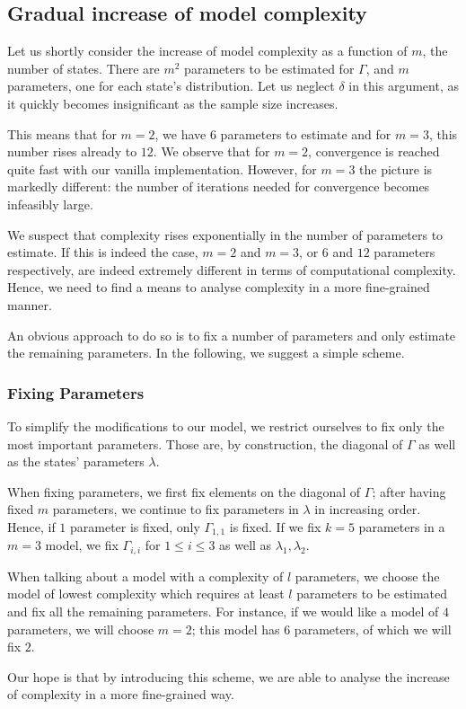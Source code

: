 \subsection{Gradual increase of model complexity}

Let us shortly consider the increase of model complexity as a function of $m$, the number of states. There are $m^2$ parameters to be estimated for $\Gamma$, and $m$ parameters, one for each state's distribution. Let us neglect $\delta$ in this argument, as 
it quickly becomes insignificant as the sample size increases.

This means that for $m=2$, we have $6$ parameters to estimate and for $m=3$, this number rises already to $12$. We observe that for $m=2$, convergence is reached quite fast with our vanilla implementation. However, for $m=3$ the picture is markedly different: the number of iterations needed for convergence becomes infeasibly large.
 
We suspect that complexity rises exponentially in the number of parameters to estimate. If this is indeed the case, $m=2$ and $m=3$, or $6$ and $12$ parameters respectively, are indeed extremely different in terms of computational complexity. Hence, we need to find a means to analyse complexity in a more fine-grained manner. 


An obvious approach to do so is to fix a number of parameters and only estimate the remaining parameters.  In the following, we suggest a simple scheme. 


\subsubsection{Fixing Parameters}
To simplify the modifications to our model, we restrict ourselves to fix only the most important parameters. Those are, by construction, the diagonal of $\Gamma$ as well as the states' parameters $\lambda$. 

When fixing parameters, we first fix elements on the diagonal of $\Gamma$; after having fixed $m$ parameters, we continue to fix parameters in $\lambda$ in increasing order. Hence, if $1$ parameter is fixed, only $\Gamma_{1,1}$ is fixed. If we fix $k=5$ parameters in a $m=3$ model, we fix $\Gamma_{i, i}$ for $1 \leq i \leq 3$ as well as $\lambda_1, \lambda_2$.

When talking about a model with a complexity of $l$ parameters, we choose the model of lowest complexity which requires at least $l$ parameters to be estimated and fix all the remaining parameters. For instance,  if we would like a model of $4$ parameters, we will choose $m=2$; this model has $6$ parameters, of which we will fix $2$. 

Our hope is that by introducing this scheme, we are able to analyse the increase of complexity in a more fine-grained way. 
